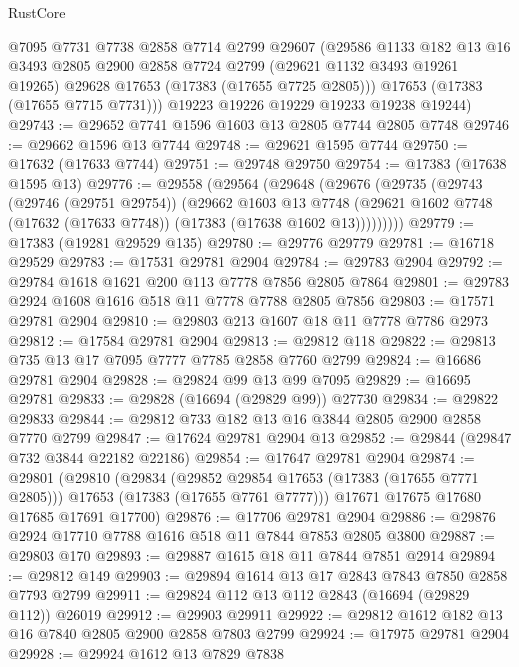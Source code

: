 \begin{lexlean}{RustCore}
\begin{coremodule}
        @7095
        @7731
        @7738
        @2858
        @7714
        @2799
        @29607
        (@29586
          @1133
          @182
          @13
          @16
          @3493
          @2805
          @2900
          @2858
          @7724
          @2799
          (@29621 @1132 @3493 @19261 @19265)
          @29628
          @17653
          (@17383 (@17655 @7725 @2805)))
        @17653
        (@17383 (@17655 @7715 @7731)))
      @19223
      @19226
      @19229
      @19233
      @19238
      @19244)
@29743 := @29652 @7741 @1596 @1603 @13 @2805 @7744 @2805 @7748
@29746 := @29662 @1596 @13 @7744
@29748 := @29621 @1595 @7744
@29750 := @17632 (@17633 @7744)
@29751 := @29748 @29750
@29754 := @17383 (@17638 @1595 @13)
@29776 := @29558
    (@29564
      (@29648
        (@29676
          (@29735
            (@29743
              (@29746 (@29751 @29754))
              (@29662
                @1603
                @13
                @7748
                (@29621 @1602 @7748 (@17632 (@17633 @7748)) (@17383 (@17638 @1602 @13)))))))))
@29779 := @17383 (@19281 @29529 @135)
@29780 := @29776 @29779
@29781 := @16718 @29529
@29783 := @17531 @29781 @2904
@29784 := @29783 @2904
@29792 := @29784 @1618 @1621 @200 @113 @7778 @7856 @2805 @7864
@29801 := @29783 @2924 @1608 @1616 @518 @11 @7778 @7788 @2805 @7856
@29803 := @17571 @29781 @2904
@29810 := @29803 @213 @1607 @18 @11 @7778 @7786 @2973
@29812 := @17584 @29781 @2904
@29813 := @29812 @118
@29822 := @29813 @735 @13 @17 @7095 @7777 @7785 @2858 @7760 @2799
@29824 := @16686 @29781 @2904
@29828 := @29824 @99 @13 @99 @7095
@29829 := @16695 @29781
@29833 := @29828 (@16694 (@29829 @99)) @27730
@29834 := @29822 @29833
@29844 := @29812 @733 @182 @13 @16 @3844 @2805 @2900 @2858 @7770 @2799
@29847 := @17624 @29781 @2904 @13
@29852 := @29844 (@29847 @732 @3844 @22182 @22186)
@29854 := @17647 @29781 @2904
@29874 := @29801
    (@29810
      (@29834
        (@29852 @29854 @17653 (@17383 (@17655 @7771 @2805)))
        @17653
        (@17383 (@17655 @7761 @7777)))
      @17671
      @17675
      @17680
      @17685
      @17691
      @17700)
@29876 := @17706 @29781 @2904
@29886 := @29876 @2924 @17710 @7788 @1616 @518 @11 @7844 @7853 @2805 @3800
@29887 := @29803 @170
@29893 := @29887 @1615 @18 @11 @7844 @7851 @2914
@29894 := @29812 @149
@29903 := @29894 @1614 @13 @17 @2843 @7843 @7850 @2858 @7793 @2799
@29911 := @29824 @112 @13 @112 @2843 (@16694 (@29829 @112)) @26019
@29912 := @29903 @29911
@29922 := @29812 @1612 @182 @13 @16 @7840 @2805 @2900 @2858 @7803 @2799
@29924 := @17975 @29781 @2904
@29928 := @29924 @1612 @13 @7829 @7838

\end{coremodule}
\end{lexlean}
